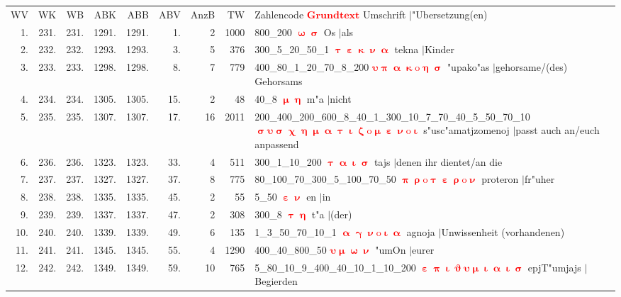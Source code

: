 \documentclass[a4paper,10pt,landscape]{article}
\begin{document}
\begin{tabular}{rrrrrrrrp{120mm}}
WV&WK&WB&ABK&ABB&ABV&AnzB&TW&Zahlencode \textcolor{red}{$\boldsymbol{Grundtext}$} Umschrift $|$"Ubersetzung(en)\\
1.&231.&231.&1291.&1291.&1.&2&1000&800\_200 \textcolor{red}{$\boldsymbol{\upomega\upsigma}$} Os $|$als\\
2.&232.&232.&1293.&1293.&3.&5&376&300\_5\_20\_50\_1 \textcolor{red}{$\boldsymbol{\uptau\upepsilon\upkappa\upnu\upalpha}$} tekna $|$Kinder\\
3.&233.&233.&1298.&1298.&8.&7&779&400\_80\_1\_20\_70\_8\_200 \textcolor{red}{$\boldsymbol{\upsilon\uppi\upalpha\upkappa\mathrm{o}\upeta\upsigma}$} "upako"as $|$gehorsame/(des) Gehorsams\\
4.&234.&234.&1305.&1305.&15.&2&48&40\_8 \textcolor{red}{$\boldsymbol{\upmu\upeta}$} m"a $|$nicht\\
5.&235.&235.&1307.&1307.&17.&16&2011&200\_400\_200\_600\_8\_40\_1\_300\_10\_7\_70\_40\_5\_50\_70\_10 \textcolor{red}{$\boldsymbol{\upsigma\upsilon\upsigma\upchi\upeta\upmu\upalpha\uptau\upiota\upzeta\mathrm{o}\upmu\upepsilon\upnu\mathrm{o}\upiota}$} s"usc"amatjzomenoj $|$passt auch an/euch anpassend\\
6.&236.&236.&1323.&1323.&33.&4&511&300\_1\_10\_200 \textcolor{red}{$\boldsymbol{\uptau\upalpha\upiota\upsigma}$} tajs $|$denen ihr dientet/an die\\
7.&237.&237.&1327.&1327.&37.&8&775&80\_100\_70\_300\_5\_100\_70\_50 \textcolor{red}{$\boldsymbol{\uppi\uprho\mathrm{o}\uptau\upepsilon\uprho\mathrm{o}\upnu}$} proteron $|$fr"uher\\
8.&238.&238.&1335.&1335.&45.&2&55&5\_50 \textcolor{red}{$\boldsymbol{\upepsilon\upnu}$} en $|$in\\
9.&239.&239.&1337.&1337.&47.&2&308&300\_8 \textcolor{red}{$\boldsymbol{\uptau\upeta}$} t"a $|$(der)\\
10.&240.&240.&1339.&1339.&49.&6&135&1\_3\_50\_70\_10\_1 \textcolor{red}{$\boldsymbol{\upalpha\upgamma\upnu\mathrm{o}\upiota\upalpha}$} agnoja $|$Unwissenheit (vorhandenen)\\
11.&241.&241.&1345.&1345.&55.&4&1290&400\_40\_800\_50 \textcolor{red}{$\boldsymbol{\upsilon\upmu\upomega\upnu}$} "umOn $|$eurer\\
12.&242.&242.&1349.&1349.&59.&10&765&5\_80\_10\_9\_400\_40\_10\_1\_10\_200 \textcolor{red}{$\boldsymbol{\upepsilon\uppi\upiota\upvartheta\upsilon\upmu\upiota\upalpha\upiota\upsigma}$} epjT"umjajs $|$Begierden\\
\end{tabular}\medskip \\
\end{document}
